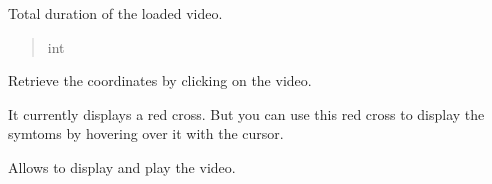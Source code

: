 \documentclass[letterpaper,10pt,english]{sphinxmanual}
\begin{document}
\begin{fulllineitems}
\begin{fulllineitems}
\begin{quote}
\begin{description}
\end{description}\end{quote}

\end{fulllineitems}


\begin{fulllineitems}
\label{\detokenize{general_interface:general_interface_V10.LecteurVideo.duree_totale}}
\pysigstartsignatures
{}
\pysigstopsignatures
\sphinxAtStartPar
Total duration of the loaded video.
\begin{quote}\begin{description}
\sphinxAtStartPar
int

\end{description}\end{quote}

\end{fulllineitems}


\begin{fulllineitems}
\label{\detokenize{general_interface:general_interface_V10.LecteurVideo.afficher_menu_annotations}}
\pysigstartsignatures
{}
\pysigstopsignatures
\sphinxAtStartPar
Retrieve the coordinates by clicking on the video.

\sphinxAtStartPar
It currently displays a red cross.
But you can use this red cross to display the symtoms by hovering over it with the cursor.

\end{fulllineitems}


\begin{fulllineitems}
\label{\detokenize{general_interface:general_interface_V10.LecteurVideo.afficher_video}}
\pysigstartsignatures
{}
\pysigstopsignatures
\sphinxAtStartPar
Allows to display and play the video.


\end{fulllineitems}
\end{fulllineitems}
\end{document}

